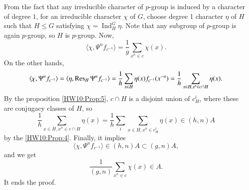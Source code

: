 \documentclass[a4paper, 12pt]{article}
\theoremstyle{Mydefinition}
\theoremstyle{Mytheorem}
\DeclareMathOperator{\Ind}{Ind}
\begin{document}
From the fact that any irreducible character of $p$-group is induced by a character of degree $1$, for an irreducible character $\chi$ of $G$, choose degree 1 character $\eta$ of $H$ such that $H\leq G$ satisfying $\chi = \Ind_H^G \eta$. Note that any subgroup of $p$-group is again $p$-group, so $H$ is $p$-group. Now,
\begin{equation}
    \langle \chi,\Psi^n f_{c^{-1}}\rangle = \frac{1}{g}\sum_{x^n\in c}\chi(x).
\end{equation}
On the other hands,
\begin{equation}
    \langle \chi,\Psi^n f_{c^{-1}}\rangle = \langle \eta,\Res_H\Psi^n f_{c^{-1}}\rangle =\frac{1}{h}\sum_{x\in H}\eta(x)f_{c^{-1}}(x^{-n}) = \frac{1}{h}\sum_{x\in H, x^n\in c\cap H}\eta(x).
\end{equation}
By the proposition \ref{HW10:Prop:5}, $c\cap H$ is a disjoint union of $c_H^i$, where these are conjugacy classes of $H$, so
\begin{equation}
    \frac{1}{h}\sum_{x\in H, x^n\in c\cap H}\eta(x) = \frac{1}{h}\sum_i\sum_{x\in H, x^n\in c^i_H}\eta(x)\in (h,n)A
\end{equation}
by the \ref{HW10:Prop:4}. Finally, it implies
\begin{equation}
    \langle \chi,\Psi^n f_{c^{-1}}\rangle\in (h,n)A\subset (g,n)A,
\end{equation}
and we get
\begin{equation}
    \frac{1}{(g,n)}\sum_{x^n\in c}\chi(x)\in A.
\end{equation}
It ends the proof.
\end{document}
